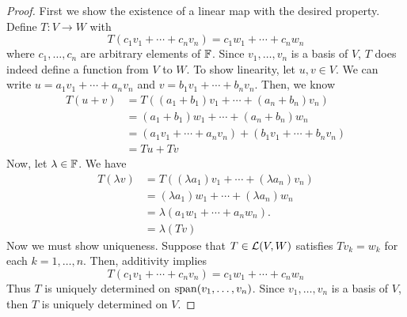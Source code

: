 \begin{proof}
    First we show the existence of a linear map with the desired property. Define $T: V\to W$ with
    \[ T(c_1v_1 + \cdots + c_nv_n) = c_1w_1 + \cdots + c_nw_n \]
    where $c_1, \dots, c_n$ are arbitrary elements of $\mathbb F$. Since $v_1, \dots, v_n$ is a basis of $V$, $T$ does indeed define a function from $V$ to $W$. To show linearity, let $u,v \in V$. We can write $u = a_1v_1 + \cdots + a_nv_n$ and $v = b_1v_1 + \cdots + b_nv_n$. Then, we know
    \begin{align*}
        T(u+v) &= T((a_1+b_1)v_1 + \cdots + (a_n+b_n)v_n) \\
        &= (a_1+b_1)w_1 + \cdots + (a_n+b_n)w_n \\
        &= (a_1v_1 + \cdots + a_nv_n) + (b_1v_1 + \cdots + b_nv_n) \\
        &= Tu + Tv
    \end{align*}
    Now, let $\lambda \in \mathbb F$. We have
    \begin{align*}
        T(\lambda v) &= T((\lambda a_1)v_1 + \cdots + (\lambda a_n)v_n) \\
        &= (\lambda a_1)w_1 + \cdots + (\lambda a_n)w_n \\
        &= \lambda(a_1w_1 + \cdots + a_nw_n). \\
        &= \lambda (Tv)
    \end{align*}
    Now we must show uniqueness. Suppose that $T\in \mathcal{L}(V,W)$ satisfies $Tv_k = w_k$ for each $k = 1, \dots, n$. Then, additivity implies
    \[ T(c_1v_1 + \cdots + c_nv_n) = c_1w_1 + \cdots + c_nw_n\]
    Thus $T$ is uniquely determined on $\operatorname{span}(v_1, \dots, v_n)$. Since $v_1, \dots, v_n$ is a basis of $V$, then $T$ is uniquely determined on $V$.
\end{proof}
